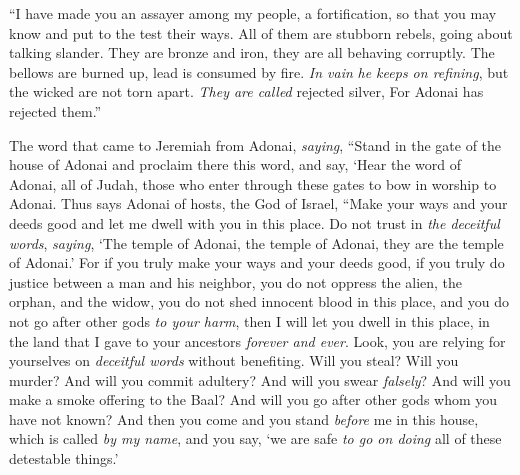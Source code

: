 \begin{biblechapter}
\verse “I have made you an assayer among my people, a fortification, 
so that you may know and put to the test their ways.
\verse All of them are stubborn rebels, 
going about talking slander. 
They are bronze and iron, 
they are all behaving corruptly.
\verse The bellows are burned up, 
lead is consumed by fire. 
\textit{In vain} \textit{he keeps on refining}, 
but the wicked are not torn apart.
\verse \textit{They are called} rejected silver, 
For Adonai has rejected them.”
\end{biblechapter}

\begin{biblechapter} %
 The word that came to Jeremiah from Adonai, \textit{saying},
\verse “Stand in the gate of the house of Adonai and proclaim there this word, and say, ‘Hear the word of Adonai, all of Judah, those who enter through these gates to bow in worship to Adonai.
\verse Thus says Adonai of hosts, the God of Israel, “Make your ways and your deeds good and let me dwell with you in this place.
\verse Do not trust in \textit{the deceitful words}, \textit{saying}, ‘The temple of Adonai, the temple of Adonai, they are the temple of Adonai.’
\verse For if you truly make your ways and your deeds good, if you truly do justice between a man and his neighbor,
\verse you do not oppress the alien, the orphan, and the widow, you do not shed innocent blood in this place, and you do not go after other gods \textit{to your harm},
\verse then I will let you dwell in this place, in the land that I gave to your ancestors \textit{forever and ever}.
\verse Look, you are relying for yourselves on \textit{deceitful words} without benefiting.
\verse Will you steal? Will you murder? And will you commit adultery? And will you swear \textit{falsely}? And will you make a smoke offering to the Baal? And will you go after other gods whom you have not known?
\verse And then you come and you stand \textit{before} me in this house, which is called \textit{by my name}, and you say, ‘we are safe \textit{to go on doing} all of these detestable things.’

\end{biblechapter}
